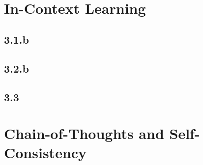 \documentclass{article}
\begin{document}
\subsection{}


\section{In-Context Learning}
\subsection*{3.1.b}

\subsection*{3.2.b}

\subsection*{3.3}


\section{Chain-of-Thoughts and Self-Consistency}
\subsection{}

\subsection{}

\subsection{}


\newpage


\end{document}
